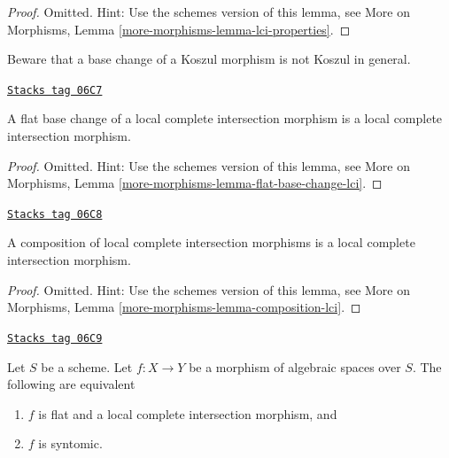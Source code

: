\begin{proof}
Omitted. Hint: Use the schemes version of this lemma, see
More on Morphisms,
Lemma \ref{more-morphisms-lemma-lci-properties}.
\end{proof}

Beware that a base change of a Koszul morphism is not Koszul in general.

\begin{lemma}
\label{spaces-more-morphisms-lemma-flat-base-change-lci}
\href{https://stacks.math.columbia.edu/tag/06C7}{\texttt{Stacks tag 06C7}}

A flat base change of a local complete intersection morphism is a
local complete intersection morphism.
\end{lemma}

\begin{proof}
Omitted. Hint: Use the schemes version of this lemma, see
More on Morphisms,
Lemma \ref{more-morphisms-lemma-flat-base-change-lci}.
\end{proof}

\begin{lemma}
\label{spaces-more-morphisms-lemma-composition-lci}
\href{https://stacks.math.columbia.edu/tag/06C8}{\texttt{Stacks tag 06C8}}

A composition of local complete intersection morphisms is a
local complete intersection morphism.
\end{lemma}

\begin{proof}
Omitted. Hint: Use the schemes version of this lemma, see
More on Morphisms,
Lemma \ref{more-morphisms-lemma-composition-lci}.
\end{proof}

\begin{lemma}
\label{spaces-more-morphisms-lemma-flat-lci}
\href{https://stacks.math.columbia.edu/tag/06C9}{\texttt{Stacks tag 06C9}}


Let $S$ be a scheme.
Let $f : X \to Y$ be a morphism of algebraic spaces over $S$.
The following are equivalent
\begin{enumerate}
\item $f$ is flat and a local complete intersection morphism, and
\item $f$ is syntomic.
\end{enumerate}
\end{lemma}

